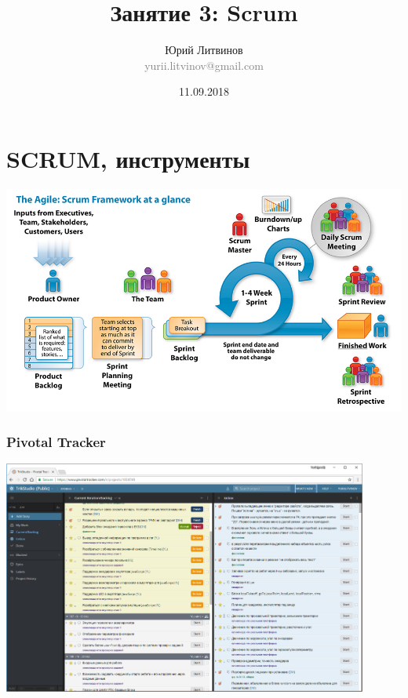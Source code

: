 \documentclass[xetex,mathserif,serif]{beamer}
\title{Занятие 3: Scrum}
\author[Юрий Литвинов]{Юрий Литвинов\\\small{\textcolor{gray}{yurii.litvinov@gmail.com}}}
\date{11.09.2018}
\begin{document}
	\frame{\titlepage}

	\section{SCRUM, инструменты}

	\begin{frame}
		\begin{center}
			\includegraphics[width=\textwidth]{scrum.png}
		\end{center}
	\end{frame}

	\begin{frame}
		\frametitle{Pivotal Tracker}
		\begin{center}
			\includegraphics[width=0.9\textwidth]{pivotalTracker.png}
		\end{center}
	\end{frame}
\end{document}
